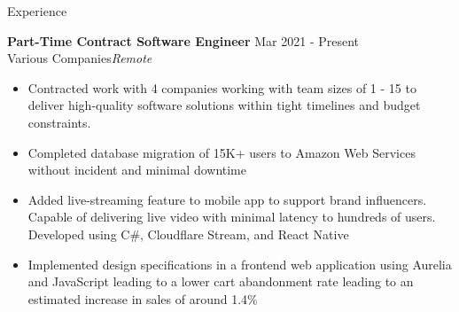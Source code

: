 \documentclass{resume} %
\begin{document}
\begin{rSection}{Experience}

\textbf{Part-Time Contract Software Engineer} \hfill Mar 2021 -  Present\\
Various Companies\hfill \textit{Remote}
\begin{itemize}
   \itemsep -3pt {} 
   \item Contracted work with 4 companies working with team sizes of 1 - 15 to deliver high-quality software solutions within tight timelines and budget constraints.
    \item Completed database migration of 15K+ users to Amazon Web Services without incident and minimal downtime
    \item Added live-streaming feature to mobile app to support brand influencers. Capable of delivering live video with minimal latency to hundreds of
          users. Developed using C\#, Cloudflare Stream, and React Native
    \item Implemented design specifications in a frontend web application using Aurelia and JavaScript leading to a lower cart abandonment rate
     leading to an estimated increase in sales of around 1.4\%
\end{itemize}





\end{rSection}
\end{document}
